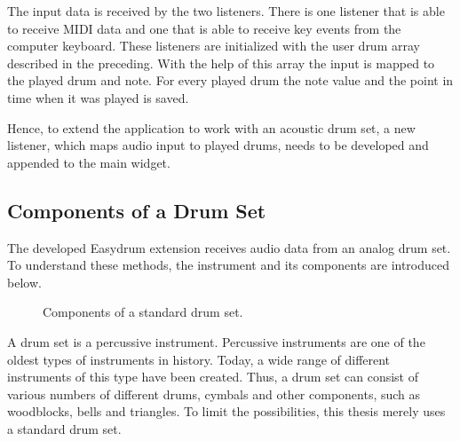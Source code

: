 The input data is received by the two listeners. There is one listener that is able to receive MIDI data and one that is able to receive key events from the computer keyboard. These listeners are initialized with the user drum array described in the preceding. With the help of this array the input is mapped to the played drum and note. For every played drum the note value and the point in time when it was played is saved.

Hence, to extend the application to work with an acoustic drum set, a new listener, which maps audio input to played drums, needs to be developed and appended to the main widget.

\subsection{Components of a Drum Set}

The developed Easydrum extension receives audio data from an analog drum set. To understand these methods, the instrument and its components are introduced below.

\begin{figure}[htb]
	\centering
	\qquad
	\caption{
		Components of a standard drum set.
	}
	\label{fig:drumset}
\end{figure}

A drum set is a percussive instrument. Percussive instruments are one of the oldest types of instruments in history. Today, a wide range of different instruments of this type have been created. Thus, a drum set can consist of various numbers of different drums, cymbals and other components, such as woodblocks, bells and triangles. To limit the possibilities, this thesis merely uses a standard drum set.

